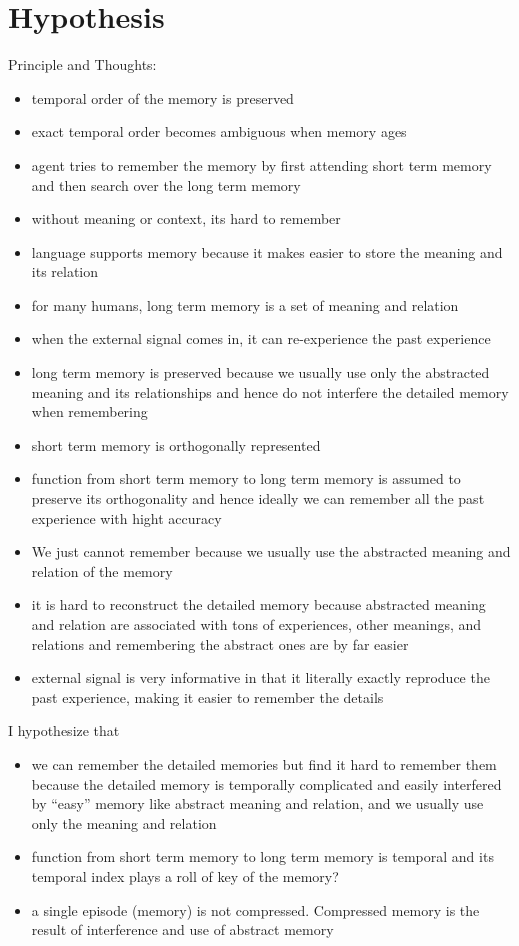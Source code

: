 \documentclass[12pt]{article}
\begin{document}
\section{Hypothesis}
Principle and Thoughts:
\begin{itemize}
    \item temporal order of the memory is preserved
    \item exact temporal order becomes ambiguous when memory ages
    \item agent tries to remember the memory by first attending short term memory and then search 
          over the long term memory 
    \item without meaning or context, its hard to remember
    \item language supports memory because it makes easier to store the meaning and its relation
    \item for many humans, long term memory is a set of meaning and relation
    \item when the external signal comes in, it can re-experience the past experience
    \item long term memory is preserved because we usually use only the abstracted meaning and its relationships
          and hence do not interfere the detailed memory when remembering
    \item short term memory is orthogonally represented
    \item function from short term memory to long term memory is assumed to preserve its orthogonality
          and hence ideally we can remember all the past experience with hight accuracy
    \item We just cannot remember because we usually use the abstracted meaning and relation 
          of the memory 
    \item it is hard to reconstruct the detailed memory because abstracted meaning and relation are 
          associated with tons of experiences, other meanings, and relations and remembering the abstract
          ones are by far easier
    \item external signal is very informative in that it literally exactly reproduce the past experience, 
          making it easier to remember the details
\end{itemize}

I hypothesize that 
\begin{itemize}
    \item we can remember the detailed memories but find it hard to remember them because 
          the detailed memory is temporally complicated and easily interfered by ``easy'' memory 
          like abstract meaning and relation, and we usually use only the meaning and relation
    \item function from short term memory to long term memory is temporal and its temporal index 
          plays a roll of key of the memory?
    \item a single episode (memory) is not compressed. Compressed memory is the result of interference 
          and use of abstract memory
\end{itemize}
\end{document}
